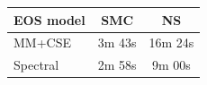 \renewcommand{\arraystretch}{1.4}
\begin{tabular}{lcc}
    \hline
    EOS model & SMC & NS \\
    \hline
    MM+CSE & 3m 43s & 16m 24s \\
    Spectral & 2m 58s & 9m 00s \\
    \hline
\end{tabular}

